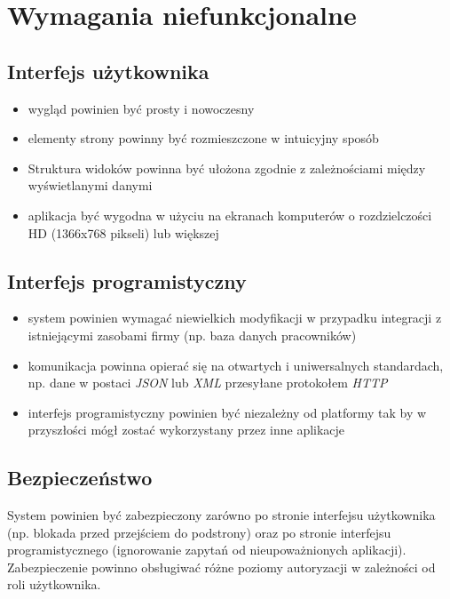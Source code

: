 \documentclass[eng,printmode,openany]{mgr}
\begin{document}
	\section{Wymagania niefunkcjonalne}
	\subsection{Interfejs użytkownika}
	\begin{itemize}
		\item wygląd powinien być prosty i nowoczesny
		\item elementy strony powinny być rozmieszczone w intuicyjny sposób
		\item Struktura widoków powinna być ułożona zgodnie z zależnościami między wyświetlanymi danymi
		\item aplikacja być wygodna w użyciu na ekranach komputerów o rozdzielczości HD (1366x768 pikseli) lub większej
	\end{itemize}
	\subsection{Interfejs programistyczny}
	\begin{itemize}
		\item system powinien wymagać niewielkich modyfikacji w przypadku integracji z istniejącymi zasobami firmy (np. baza danych pracowników)
		\item komunikacja powinna opierać się na otwartych i uniwersalnych standardach, np. dane w postaci \textit{JSON} lub \textit{XML} przesyłane protokołem \textit{HTTP}
		\item interfejs programistyczny powinien być niezależny od platformy tak by w przyszłości mógł zostać wykorzystany przez inne aplikacje
	\end{itemize}
	\subsection{Bezpieczeństwo}
	System powinien być zabezpieczony zarówno po stronie interfejsu użytkownika (np. blokada przed przejściem do podstrony) oraz po stronie interfejsu programistycznego (ignorowanie zapytań od nieupoważnionych aplikacji). Zabezpieczenie powinno obsługiwać różne poziomy autoryzacji w zależności od roli użytkownika.
	
	\newpage
\end{document}
